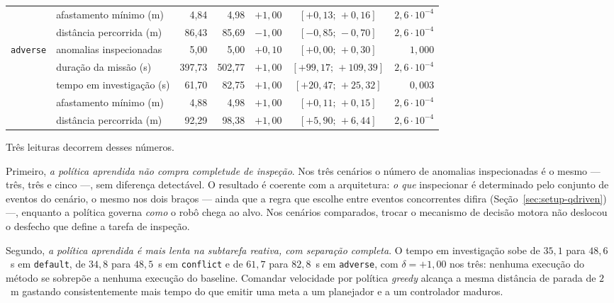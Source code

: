\begin{table}[htb]
\begin{tabular}{llrrrcr}
                  & afastamento mínimo (m)    & 4,84 & 4,98 & $+1{,}00$ & $[+0{,}13;\,+0{,}16]$ & $2{,}6\cdot10^{-4}$\\
                  & distância percorrida (m)  & 86,43 & 85,69 & $-1{,}00$ & $[-0{,}85;\,-0{,}70]$ & $2{,}6\cdot10^{-4}$\\
\hline
\texttt{adverse}  & anomalias inspecionadas   & 5,00 & 5,00 & $+0{,}10$ & $[+0{,}00;\,+0{,}30]$ & $1{,}000$\\
                  & duração da missão (s)     & 397,73 & 502,77 & $+1{,}00$ & $[+99{,}17;\,+109{,}39]$ & $2{,}6\cdot10^{-4}$\\
                  & tempo em investigação (s) & 61,70 & 82,75 & $+1{,}00$ & $[+20{,}47;\,+25{,}32]$ & $0{,}003$\\
                  & afastamento mínimo (m)    & 4,88 & 4,98 & $+1{,}00$ & $[+0{,}11;\,+0{,}15]$ & $2{,}6\cdot10^{-4}$\\
                  & distância percorrida (m)  & 92,29 & 98,38 & $+1{,}00$ & $[+5{,}90;\,+6{,}44]$ & $2{,}6\cdot10^{-4}$\\
\hline
\end{tabular}
\end{table}

Três leituras decorrem desses números.

Primeiro, \emph{a política aprendida não compra completude de inspeção}. Nos três
cenários o número de anomalias inspecionadas é o mesmo --- três, três e cinco ---, sem
diferença detectável. O resultado é coerente com a arquitetura: \emph{o que}
inspecionar é determinado pelo conjunto de eventos do cenário, o mesmo nos dois braços
--- ainda que a regra que escolhe entre eventos concorrentes difira
(Seção~\ref{sec:setup-qdriven}) ---, enquanto a política governa \emph{como} o robô
chega ao alvo. Nos cenários comparados, trocar o mecanismo de decisão motora não
deslocou o desfecho que define a tarefa de inspeção.

Segundo, \emph{a política aprendida é mais lenta na subtarefa reativa, com separação
completa}. O tempo em investigação sobe de $35{,}1$ para $48{,}6$~s em
\texttt{default}, de $34{,}8$ para $48{,}5$~s em \texttt{conflict} e de $61{,}7$ para
$82{,}8$~s em \texttt{adverse}, com $\delta=+1{,}00$ nos três: nenhuma execução do
método se sobrepõe a nenhuma execução do baseline. Comandar velocidade por política
\textit{greedy} alcança a mesma distância de parada de $2$~m gastando
consistentemente mais tempo do que emitir uma meta a um planejador e a um controlador
maduros.

